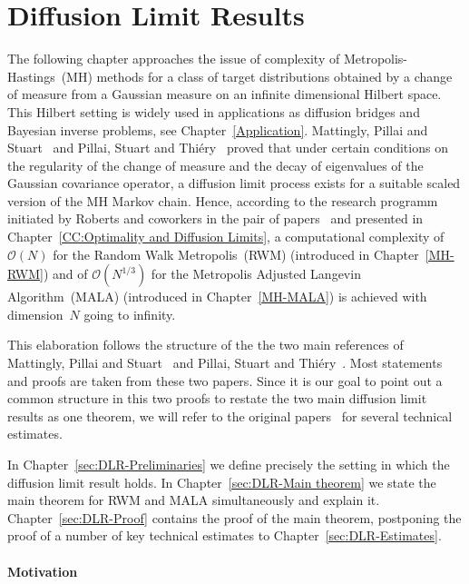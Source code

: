 \chapter{Diffusion Limit Results}
\label{Diffusion Limit Results}

The following chapter approaches the issue of complexity of Metropolis-Hastings~(MH) methods for a class of target distributions obtained by a change of measure from a Gaussian measure on an infinite dimensional Hilbert space. This Hilbert setting is widely used in applications as diffusion bridges and Bayesian inverse problems, see Chapter~\ref{Application}. Mattingly, Pillai and Stuart~\autocite{Mattingly2010} and Pillai, Stuart and Thi\'{e}ry~\autocite{Pillai2012} proved that under certain conditions on the regularity of the change of measure and the decay of eigenvalues of the Gaussian covariance operator, a diffusion limit process exists for a suitable scaled version of the MH Markov chain. Hence, according to the research programm initiated by Roberts and coworkers in the pair of papers~\autocite{Roberts1997, Roberts1998} and presented in Chapter~\ref{CC:Optimality and Diffusion Limits}, a computational complexity of $\mathcal{O}(N)$ for the Random Walk Metropolis~(RWM) (introduced in Chapter~\ref{MH-RWM}) and of $\mathcal{O}(N^{1/3})$ for the Metropolis Adjusted Langevin Algorithm~(MALA) (introduced in Chapter~\ref{MH-MALA}) is achieved with dimension~$N$ going to infinity.

This elaboration follows the structure of the the two main references of Mattingly, Pillai and Stuart~\autocite{Mattingly2010} and Pillai, Stuart and Thi\'{e}ry~\autocite{Pillai2012}. Most statements and proofs are taken from these two papers. Since it is our goal to point out a common structure in this two proofs to restate the two main diffusion limit results as one theorem, we will refer to the original papers~\autocite{Mattingly2010, Pillai2012} for several technical estimates.

In Chapter~\ref{sec:DLR-Preliminaries} we define precisely the setting in which the diffusion limit result holds. In Chapter~\ref{sec:DLR-Main theorem} we state the main theorem for RWM and MALA simultaneously and explain it. Chapter~\ref{sec:DLR-Proof} contains the proof of the main theorem, postponing the proof of a number of key technical estimates to Chapter~\ref{sec:DLR-Estimates}.


\subsubsection{Motivation}

